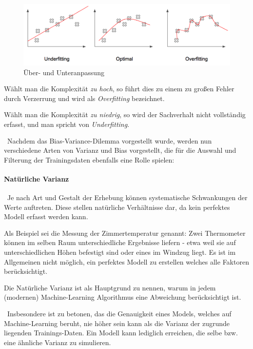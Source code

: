 \begin{figure}[h]
	\begin{center}
		\includegraphics[width=0.6\linewidth]{Bilder/Overfitting}
		\caption[Über- und Unteranpassung: \url{
			https://pythonmachinelearning.pro/a-guide-to-improving-deep-learnings-performance/}]{Über- und Unteranpassung}
		\label{fig:Overfitting}
	\end{center}
\end{figure}

Wählt man die Komplexität \textit{zu hoch}, so führt dies zu einem zu großen Fehler durch Verzerrung und wird als \textit{Overfitting} bezeichnet. 

Wählt man die Komplexität \textit{zu niedrig}, so wird der Sachverhalt nicht vollständig erfasst, und man spricht von \textit{Underfitting}.

~\newline Nachdem das Bias-Variance-Dilemma vorgestellt wurde, werden nun verschiedene Arten von Varianz und Bias vorgestellt, die für die Auswahl und Filterung der Trainingsdaten ebenfalls eine Rolle spielen:
\paragraph{Natürliche Varianz} ~\newline Je nach Art und Gestalt der Erhebung können systematische Schwankungen der Werte auftreten. Diese stellen natürliche Verhältnisse dar, da kein perfektes Modell erfasst werden kann. 

Als Beispiel sei die Messung der Zimmertemperatur genannt: Zwei Thermometer können im selben Raum unterschiedliche Ergebnisse liefern - etwa weil sie auf unterschiedlichen Höhen befestigt sind oder eines im Windzug liegt. Es ist im Allgemeinen nicht möglich, ein perfektes Modell zu erstellen welches alle Faktoren berücksichtigt.

Die Natürliche Varianz ist als Hauptgrund zu nennen, warum in jedem (modernen) Machine-Learning Algorithmus eine Abweichung berücksichtigt ist.

~\newline Insbesondere ist  zu betonen, das die Genauigkeit eines Models, welches auf Machine-Learning beruht, nie höher sein kann als die Varianz der zugrunde liegenden Trainings-Daten. Ein Modell kann lediglich erreichen, die selbe bzw. eine ähnliche Varianz zu simulieren.

